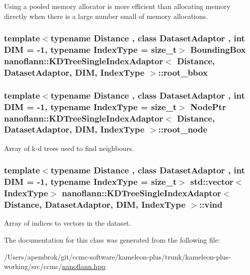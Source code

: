 Using a pooled memory allocator is more efficient than allocating memory directly when there is a large number small of memory allocations. \hypertarget{classnanoflann_1_1_k_d_tree_single_index_adaptor_a691ddd52bbdb882177cc21d1162df05b}{
\subsubsection[{root\-\_\-bbox}]{\setlength{\rightskip}{0pt plus 5cm}template$<$typename Distance , class Dataset\-Adaptor , int D\-I\-M = -\/1, typename Index\-Type  = size\-\_\-t$>$ {\bf Bounding\-Box} {\bf nanoflann\-::\-K\-D\-Tree\-Single\-Index\-Adaptor}$<$ Distance, Dataset\-Adaptor, D\-I\-M, Index\-Type $>$\-::root\-\_\-bbox\hspace{0.3cm}{\ttfamily [protected]}}}\label{classnanoflann_1_1_k_d_tree_single_index_adaptor_a691ddd52bbdb882177cc21d1162df05b}
\hypertarget{classnanoflann_1_1_k_d_tree_single_index_adaptor_a1dd45d22dddb21bdd30695ac5e443364}{
\subsubsection[{root\-\_\-node}]{\setlength{\rightskip}{0pt plus 5cm}template$<$typename Distance , class Dataset\-Adaptor , int D\-I\-M = -\/1, typename Index\-Type  = size\-\_\-t$>$ {\bf Node\-Ptr} {\bf nanoflann\-::\-K\-D\-Tree\-Single\-Index\-Adaptor}$<$ Distance, Dataset\-Adaptor, D\-I\-M, Index\-Type $>$\-::root\-\_\-node\hspace{0.3cm}{\ttfamily [protected]}}}\label{classnanoflann_1_1_k_d_tree_single_index_adaptor_a1dd45d22dddb21bdd30695ac5e443364}
Array of k-\/d trees used to find neighbours. \hypertarget{classnanoflann_1_1_k_d_tree_single_index_adaptor_a6d870be761aaf13d1a9b318d4d448469}{
\subsubsection[{vind}]{\setlength{\rightskip}{0pt plus 5cm}template$<$typename Distance , class Dataset\-Adaptor , int D\-I\-M = -\/1, typename Index\-Type  = size\-\_\-t$>$ std\-::vector$<$Index\-Type$>$ {\bf nanoflann\-::\-K\-D\-Tree\-Single\-Index\-Adaptor}$<$ Distance, Dataset\-Adaptor, D\-I\-M, Index\-Type $>$\-::vind\hspace{0.3cm}{\ttfamily [protected]}}}\label{classnanoflann_1_1_k_d_tree_single_index_adaptor_a6d870be761aaf13d1a9b318d4d448469}
Array of indices to vectors in the dataset. 

The documentation for this class was generated from the following file\-:\begin{DoxyCompactItemize}
\item 
/\-Users/apembrok/git/ccmc-\/software/kameleon-\/plus/trunk/kameleon-\/plus-\/working/src/ccmc/\hyperlink{nanoflann_8hpp}{nanoflann.\-hpp}\end{DoxyCompactItemize}
